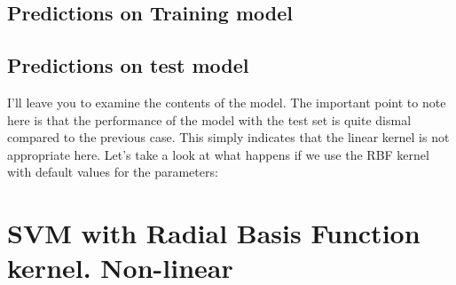 \documentclass[]{book}
\newenvironment{Shaded}{\begin{snugshade}}{\end{snugshade}}
\newcommand{\CommentTok}[1]{\textcolor[rgb]{0.56,0.35,0.01}{\textit{#1}}}
\newcommand{\DataTypeTok}[1]{\textcolor[rgb]{0.13,0.29,0.53}{#1}}
\newcommand{\KeywordTok}[1]{\textcolor[rgb]{0.13,0.29,0.53}{\textbf{#1}}}
\newcommand{\NormalTok}[1]{#1}
\newcommand{\OperatorTok}[1]{\textcolor[rgb]{0.81,0.36,0.00}{\textbf{#1}}}
\newcommand{\StringTok}[1]{\textcolor[rgb]{0.31,0.60,0.02}{#1}}
\begin{document}
\hypertarget{predictions-on-training-model-1}{%
\subsection{Predictions on Training model}\label{predictions-on-training-model-1}}

\begin{Shaded}
\end{Shaded}

\hypertarget{predictions-on-test-model-1}{%
\subsection{Predictions on test model}\label{predictions-on-test-model-1}}

\begin{Shaded}
\end{Shaded}

I'll leave you to examine the contents of the model. The important point to note here is that the performance of the model with the test set is quite dismal compared to the previous case. This simply indicates that the linear kernel is not appropriate here. Let's take a look at what happens if we use the RBF kernel with default values for the parameters:

\hypertarget{svm-with-radial-basis-function-kernel.-non-linear}{%
\section{SVM with Radial Basis Function kernel. Non-linear}\label{svm-with-radial-basis-function-kernel.-non-linear}}
\end{document}
